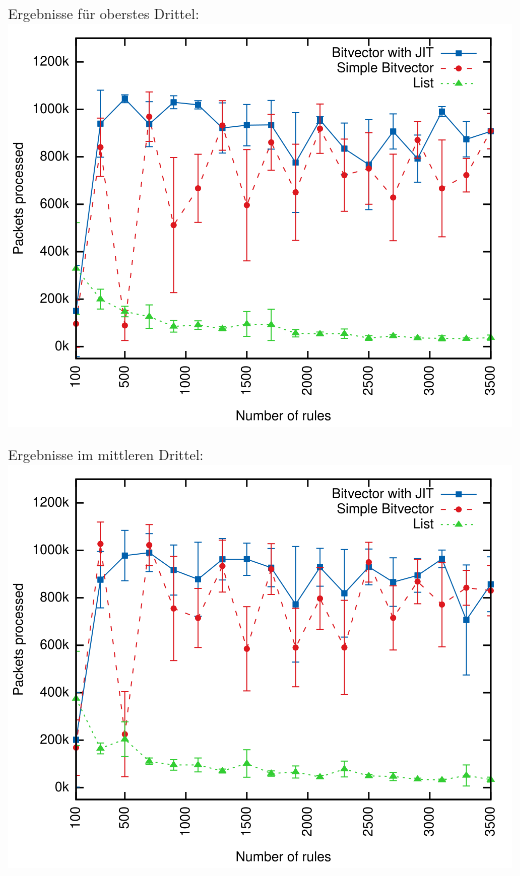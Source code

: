 \documentclass[xcolor=x11names,compress]{beamer}
\renewcommand{\(}{\begin{columns}}
\renewcommand{\)}{\end{columns}}
\newcommand{\<}[1]{\begin{column}{#1}}
\renewcommand{\>}{\end{column}}
\begin{document}
\begin{frame}[noframenumbering]
  Ergebnisse für oberstes Drittel:
  \includegraphics[height=0.9\textheight]{figures/eval_b}
\end{frame}

\begin{frame}[noframenumbering]
  Ergebnisse im mittleren Drittel:
  \includegraphics[height=0.9\textheight]{figures/eval_a}
\end{frame}
\end{document}
